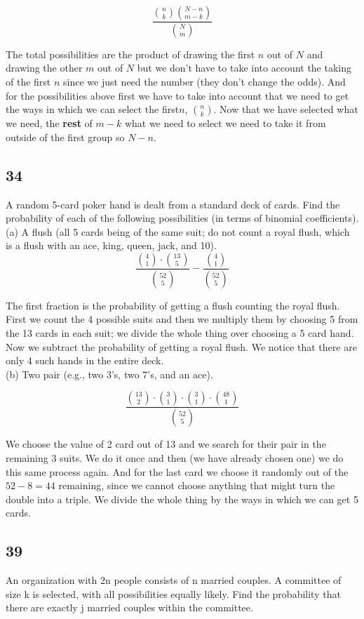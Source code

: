 \documentclass{article}
\begin{document}
$$\frac{\binom{n}{k} \binom{N-n}{m-k}}
{ \binom{N}{m}}$$

The total possibilities are the product of drawing the first $n$ out of $N$ and drawing the other $m$ out of $N$ but we don't have to take into account the taking of the first $n$ since we just need the number (they don't change the odds). And for the possibilities above first we have to take into account that we need to get the ways in which we can select the first$n$, $\binom{n}{k}$. Now that we have selected what we need, the \textbf{rest} of  $m-k$ what we need to select we need to take it from outside of the first group so $N-n$.
\newpage
\subsection{34}

A random 5-card poker hand is dealt from a standard deck of cards. Find the probability of each of the following possibilities (in terms of binomial coeﬃcients).\\
(a) A ﬂush (all 5 cards being of the same suit; do not count a royal ﬂush, which is a ﬂush with an ace, king, queen, jack, and 10).\\


$$\frac{\binom{4}{1} \cdot \binom{13}{5}}{\binom{52}{5}}-\frac{\binom{4}{1}}{\binom{52}{5}}$$

The first fraction is the probability of getting a flush counting the royal flush. First we count the 4 possible suits and then we multiply them by choosing 5 from the 13 cards in each suit; we divide the whole thing over choosing a 5 card hand. Now we subtract the probability of getting a royal flush. We notice that there are only 4 such hands in the entire deck.\\
(b) Two pair (e.g., two 3’s, two 7’s, and an ace).

$$\frac{ \binom{13}{2} \cdot \binom{3}{1} \cdot \binom{3}{1} \cdot \binom{48}{1}}{\binom{52}{5}}$$


 We choose the value of 2 card out of 13 and we search for their pair in the remaining 3 suits. We do it once and then (we have already chosen one) we do this same process again. And for the last card we choose it randomly out of the $52-8=44$ remaining, since we cannot choose anything that might turn the double into a triple. We divide the whole thing by the ways in which we can get 5 cards.

\subsection{39}
An organization with 2n people consists of n married couples. A committee of size k is selected, with all possibilities equally likely. Find the probability that there are exactly j married couples within the committee. 
\end{document}
